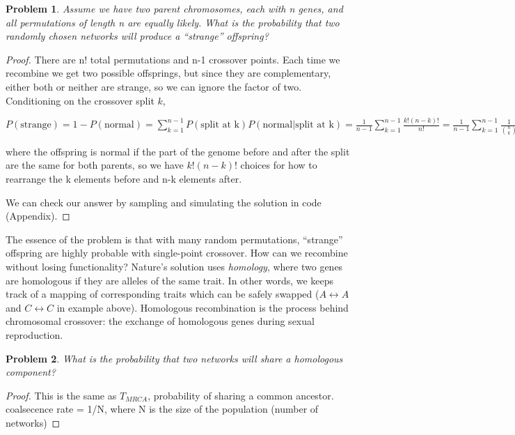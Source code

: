 \documentclass[12pt]{article}
\newtheorem{problem}{Problem}
\begin{document}
\begin{problem} Assume we have two parent chromosomes, each with n genes, and all permutations of length n are equally likely. What is the probability that two randomly chosen networks will produce a ``strange'' offspring? \end{problem}

\begin{proof}
There are n! total permutations and n-1 crossover points. Each time we recombine we get two possible offsprings, but since they are complementary, either both or neither are strange, so we can ignore the factor of two. Conditioning on the crossover split $k$,

$P(\text{strange})=1-P(\text{normal})=\sum_{k=1}^{n-1}P(\text{split at k})P(\text{normal}|\text{split at k})=\frac{1}{n-1}\sum_{k=1}^{n-1}\frac{k!(n-k)!}{n!}=\frac{1}{n-1}\sum_{k=1}^{n-1}\frac{1}{\binom{n}{k}}$

where the offspring is normal if the part of the genome before and after the split are the same for both parents, so we have $k!(n-k)!$ choices for how to rearrange the k elements before and n-k elements after.

We can check our answer by sampling and simulating the solution in code (Appendix).

\end{proof}

The essence of the problem is that with many random permutations, ``strange'' offspring are highly probable with single-point crossover. How can we recombine without losing functionality? Nature's solution uses \textit{homology}, where two genes are homologous if they are alleles of the same trait. In other words, we keeps track of a mapping of corresponding traits which can be safely swapped ($A\leftrightarrow A$ and $C\leftrightarrow C$ in example above). Homologous recombination is the process behind chromosomal crossover: the exchange of homologous genes during sexual reproduction.

\begin{problem} What is the probability that two networks will share a homologous component?
\end{problem}

\begin{proof}
This is the same as $T_{MRCA}$, probability of sharing a common ancestor.
coalsecence rate = 1/N, where N is the size of the population (number of networks) %
\end{proof}
\end{document}
